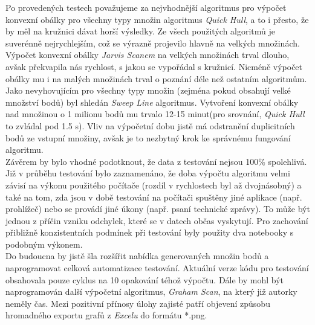 \documentclass[a4paper, 12pt]{article}
\begin{document}
Po provedených testech považujeme za nejvhodnější algoritmus pro výpočet konvexní obálky pro všechny typy množin algoritmus \textit{Quick Hull}, a to i přesto, že by měl na kružnici dávat horší výsledky. Ze všech použitých algoritmů je suverénně nejrychlejším, což se výrazně projevilo hlavně na velkých množinách. Výpočet konvexní obálky \textit{Jarvis Scanem} na velkých množinách trval dlouho, avšak překvapila nás rychlost, s jakou se vypořádal s kružnicí. Nicméně výpočet obálky mu i na malých množinách trval o poznání déle než ostatním algoritmům. Jako nevyhovujícím pro všechny typy množin (zejména pokud obsahují velké množství bodů) byl shledán \textit{Sweep Line} algoritmus. Vytvoření konvexní obálky nad množinou o 1 milionu bodů mu trvalo 12-15 minut(pro srovnání, \textit{Quick Hull} to zvládal pod 1.5 s). Vliv na výpočetní dobu jistě má odstranění duplicitních bodů ze vstupní množiny, avšak je to nezbytný krok ke správnému fungování algoritmu.\\

Závěrem by bylo vhodné podotknout, že data z testování nejsou 100\% spolehlivá. Již v průběhu testování bylo zaznamenáno, že doba výpočtu algoritmu velmi závisí na výkonu použitého počítače (rozdíl v rychlostech byl až dvojnásobný) a také na tom, zda jsou v době testování na počítači spuštěny jiné aplikace (např. prohlížeč) nebo se provádí jiné úkony (např. psaní technické zprávy). To může být jednou z příčin vzniku odchylek, které se v datech občas vyskytují. Pro zachování přibližně konzistentních podmínek při testování byly použity dva notebooky s podobným výkonem.\\

Do budoucna by jistě šla rozšířit nabídka generovaných množin bodů a naprogramovat celková automatizace testování. Aktuální verze kódu pro testování obsahovala pouze cyklus na 10 opakování téhož výpočtu. Dále by mohl být naprogramován další výpočetní algoritmus, \textit{Graham Scan}, na který již autorky neměly čas. Mezi pozitivní přínosy úlohy zajisté patří objevení způsobu hromadného exportu grafů z \textit{Excelu} do formátu *.png.

\clearpage
\end{document}
